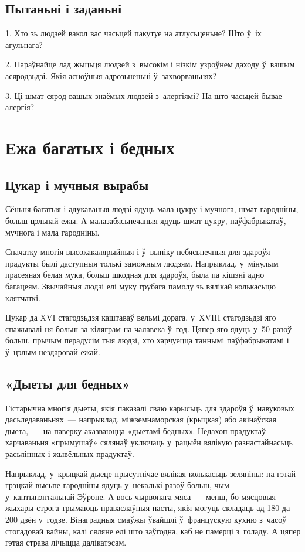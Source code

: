 \subsection*{Пытаньні і заданьні}

1. Хто зь людзей вакол вас часьцей пакутуе на атлусьценьне? Што ў~іх агульнага?

2. Параўнайце лад жыцьця людзей з~высокім і нізкім узроўнем даходу ў~вашым асяродзьдзі. Якія асноўныя адрозьненьні ў~захворваньнях?

3. Ці шмат сярод вашых знаёмых людзей з~алергіямі? На што часьцей бывае алергія?


\section{Ежа багатых і бедных}

\subsection*{Цукар і мучныя вырабы}

Сёньня багатыя і адукаваныя людзі ядуць мала цукру і мучнога, шмат гародніны, больш цэльнай ежы. А малазабясьпечаныя ядуць шмат цукру, паўфабрыкатаў, мучнога і мала гародніны.

Спачатку многія высокакалярыйныя і ў~выніку небясьпечныя для здароўя прадукты былі даступныя толькі заможным людзям. Напрыклад, у~мінулым прасеяная белая мука, больш шкодная для здароўя, была па кішэні адно багацеям. Звычайныя людзі елі муку грубага памолу зь вялікай колькасьцю клятчаткі.

Цукар да XVI стагодзьдзя каштаваў вельмі дорага, у~XVIII стагодзьдзі яго спажывалі ня больш за кіляграм на чалавека ў~год. Цяпер яго ядуць у~50 разоў больш, прычым перадусім тыя людзі, хто харчуецца таннымі паўфабрыкатамі і ў~цэлым нездаровай ежай.

\subsection*{«Дыеты для бедных»}

Гістарычна многія дыеты, якія паказалі сваю карысьць для здароўя ў~навуковых дасьледаваньнях~--- напрыклад, міжземнаморская (крыцкая) або акінаўская дыета,~--- на паверку аказваюцца «дыетамі бедных». Недахоп прадуктаў харчаваньня «прымушаў» сялянаў уключаць у~рацыён вялікую разнастайнасьць расьлінных і жывёльных прадуктаў.

Напрыклад, у~крыцкай дыеце прысутнічае вялікая колькасьць зеляніны: на гэтай грэцкай высьпе гародніны ядуць у~некалькі разоў больш, чым у~кантынэнтальнай Эўропе. А вось чырвонага мяса~--- менш, бо мясцовыя жыхары строга трымаюць праваслаўныя пасты, якія могуць складаць ад 180 да 200 дзён у~годзе. Вінаградныя смаўжы ўвайшлі ў~францускую кухню з~часоў стогадовай вайны, калі сяляне елі што заўгодна, каб не памерці з~голаду. А цяпер гэтая страва лічыцца далікатэсам.

